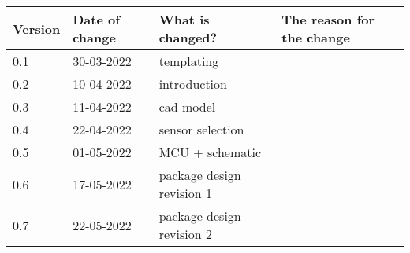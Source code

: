 \begin{tabular}{ | l | l | l | l |}
    \hline
    \textbf{Version} & \textbf{Date of change} & \textbf{What is changed?} & \textbf{The reason for the change} \\ \hline
    0.1 & 30-03-2022 & templating & \\
    0.2 & 10-04-2022 & introduction & \\
    0.3 & 11-04-2022 & cad model & \\
    0.4 & 22-04-2022 & sensor selection & \\
    0.5 & 01-05-2022 & MCU + schematic & \\
    0.6 & 17-05-2022 & package design revision 1 & \\
    0.7 & 22-05-2022 & package design revision 2 & \\
    \hline
\end{tabular}